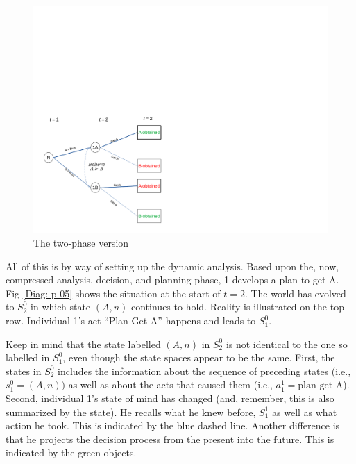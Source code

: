 \documentclass[
11pt,
titlepage,
reqno,
]{article}%
\theoremstyle{definition}
\begin{document}
\begin{figure}[h!]
	\centering
	\includegraphics*[page=3,trim = 0 2in 0in 0in,scale=.65]{Awareness_Diagrams_All}
	\caption{The two-phase version\label{Diag: p-03}}%
\end{figure}

All of this is by way of setting up the dynamic analysis. Based upon the, now, compressed analysis, decision, and planning phase, 1 develops a plan to get A. Fig \ref{Diag: p-05} shows the situation at the start of $t=2$. The world has evolved to $S^0_2$ in which state $(A,n)$ continues to hold. Reality is illustrated on the top row. Individual 1's act ``Plan Get A'' happens and leads to $S^0_1$. 

Keep in mind that the state labelled $(A,n)$ in $S^0_2$ is not identical to the one so labelled in $S^0_1$, even though the state spaces appear to be the same. First, the states in $S^0_2$ includes the information about the sequence of preceding states (i.e., $s^0_1=(A,n))$ as well as about the acts that caused them (i.e., $a^1_1 = \text{plan get A}$). Second,  individual 1's state of mind has changed (and, remember, this is also summarized by the state). He recalls what he knew before, $S^1_1$ as well as what action he took. This  is indicated by the blue dashed line. Another difference is that he projects the decision process from the present into the future. This is indicated by the green objects. 
\end{document}
